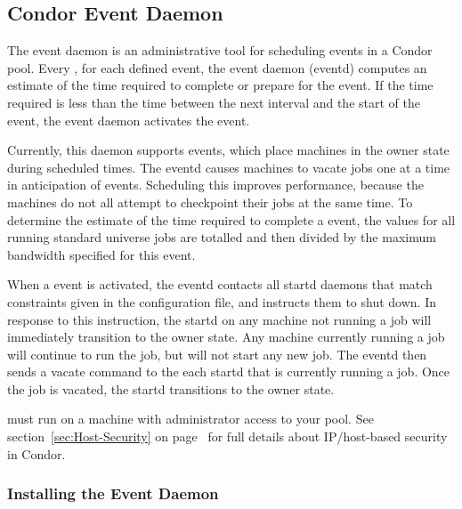 \subsection{\label{sec:EventD}
Condor Event Daemon}


The event daemon is an administrative tool for scheduling events in a
Condor pool.
Every , for each defined event, the event
daemon (eventd) computes an estimate of the time required to complete or
prepare for the event.  If the time required is less than the time
between the next interval and the start of the event, the event daemon
activates the event.

Currently, this daemon supports  events, which place machines
in the owner state during scheduled times.
The eventd causes machines to vacate jobs one at a time
in anticipation of  events.
Scheduling this improves performance, because the machines
do not all attempt to checkpoint their jobs at the same time.
To determine the estimate of the time required to complete a 
event, the  values for all running standard universe jobs are
totalled and then divided by the maximum bandwidth specified for this
event.

When a  event is activated, the eventd contacts all startd
daemons
that match constraints given in the configuration file,
and instructs them to shut down.
In response to this instruction,
the startd on any machine not running a job will immediately transition to
the owner state.
Any machine currently running a job will continue to run the
job, but will not start any new job.
The eventd then sends a vacate command to the each startd
that is currently running a job.
Once the job is vacated, the startd transitions to the
owner state.

 must run on a machine with administrator
access to your pool.
See section~\ref{sec:Host-Security} on
page~\pageref{sec:Host-Security} for full details about IP/host-based
security in Condor.

\subsubsection{\label{sec:EventD-Installation}
Installing the Event Daemon} 


